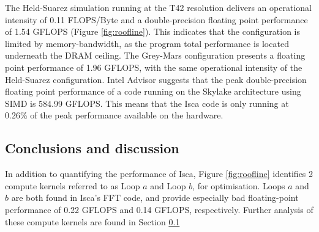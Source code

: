 \documentclass[a4paper,11pt]{report}
\begin{document}
The Held-Suarez simulation running at the T42 resolution delivers an operational intensity of 0.11 FLOPS/Byte and a double-precision floating point performance of 1.54 GFLOPS (Figure \ref{fig:roofline}). This indicates that the configuration is limited by memory-bandwidth, as the program total performance is located underneath the DRAM ceiling. The Grey-Mars configuration presents a floating point performance of 1.96 GFLOPS, with the same operational intensity of the Held-Suarez configuration. Intel Advisor suggests that the peak double-precision floating point performance of a code running on the Skylake architecture using SIMD is 584.99 GFLOPS. This means that the Isca code is only running at 0.26\% of the peak performance available on the hardware.

\subsection{Conclusions and discussion}
In addition to quantifying the performance of Isca, Figure \ref{fig:roofline} identifies 2 compute kernels referred to as Loop $a$ and Loop $b$, for optimisation. Loops $a$ and $b$ are both found in Isca's FFT code, and provide especially bad floating-point performance of 0.22 GFLOPS and 0.14 GFLOPS, respectively. Further analysis of these compute kernels are found in Section \ref{}

\end{document}

